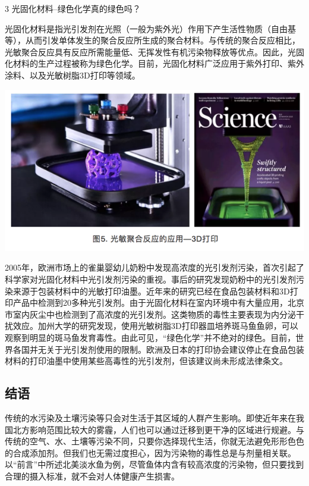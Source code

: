 \documentclass[
]{book}
\begin{document}
3 光固化材料--绿色化学真的绿色吗？

光固化材料是指光引发剂在光照（一般为紫外光）作用下产生活性物质（自由基等），从而引发单体发生的聚合反应所生成的聚合材料。与传统的聚合反应相比，光敏聚合反应具有反应所需能量低、无挥发性有机污染物释放等优点。因此，光固化材料的生产过程被称为绿色化学。目前，光固化材料广泛应用于紫外打印、紫外涂料、以及光敏树脂3D打印等领域。

\includegraphics[width=8.33in]{images/epc5}

2005年，欧洲市场上的雀巢婴幼儿奶粉中发现高浓度的光引发剂污染，首次引起了科学家对光固化材料中光引发剂污染的重视。事后的研究发现奶粉中的光引发剂污染来源于包装材料中的光敏打印油墨。近年来的研究已经在食品包装材料和3D打印产品中检测到20多种光引发剂。由于光固化材料在室内环境中有大量应用，北京市室内灰尘中也检测到了高浓度的光引发剂。这类物质的毒性主要表现为内分泌干扰效应。加州大学的研究发现，使用光敏树脂3D打印器皿培养斑马鱼鱼卵，可以观察到明显的斑马鱼发育毒性。由此可见，``绿色化学''并不绝对的绿色。目前，世界各国并无关于光引发剂使用的限制。欧洲及日本的打印协会建议停止在食品包装材料的打印油墨中使用某些高毒性的光引发剂，但该建议尚未形成法律条文。

\hypertarget{ux7ed3ux8bed-2}{%
\subsection{结语}\label{ux7ed3ux8bed-2}}

传统的水污染及土壤污染等只会对生活于其区域的人群产生影响。即使近年来在我国北方影响范围比较大的雾霾，人们也可以通过迁移到更干净的区域进行规避。与传统的空气、水、土壤等污染不同，只要你选择现代生活，你就无法避免形形色色的合成添加剂。但我们也无需过度担心，因为污染物的毒性总是与剂量相关联。以``前言''中所述北美淡水鱼为例，尽管鱼体内含有较高浓度的污染物，但只要找到合理的摄入标准，就不会对人体健康产生损害。
\end{document}
